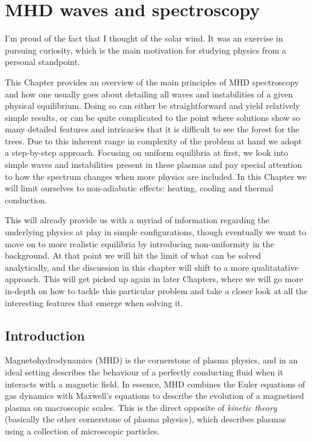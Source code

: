 \chapter{MHD waves and spectroscopy} \label{ch: spectroscopy}

\graphicspath{{02-MHD_spectroscopy/figures/}}

\begin{chapterquote}
  I'm proud of the fact that I thought of the solar wind. It was an exercise in pursuing curiosity, which is the main motivation for studying physics from a personal standpoint.
\end{chapterquote}

This Chapter provides an overview of the main principles of \gls{MHD} spectroscopy and how one usually goes about detailing all waves and instabilities of a given physical equilibrium. Doing so can either be straightforward and yield relatively simple results, or can be quite complicated to the point where solutions show so many detailed features and intricacies that it is difficult to see the forest for the trees. Due to this inherent range in complexity of the problem at hand we adopt a step-by-step approach. Focusing on uniform equilibria at first, we look into simple waves and instabilities present in these plasmas and pay special attention to how the spectrum changes when more physics are included. In this Chapter we will limit ourselves to non-adiabatic effects: heating, cooling and thermal conduction.

This will already provide us with a myriad of information regarding the underlying physics at play in simple configurations, though eventually we want to move on to more realistic equilibria by introducing non-uniformity in the background. At that point we will hit the limit of what can be solved analytically, and the discussion in this chapter will shift to a more qualitatative approach. This will get picked up again in later Chapters, where we will go more in-depth on how to tackle this particular problem and take a closer look at all the interesting features that emerge when solving it.

\section{Introduction}
Magnetohydrodynamics (\gls{MHD}) is the cornerstone of plasma physics, and in an ideal setting describes the behaviour of a perfectly conducting fluid when it interacts with a magnetic field. In essence, \gls{MHD} combines the Euler equations of gas dynamics with Maxwell's equations to describe the evolution of a magnetised plasma on macroscopic scales. This is the direct opposite of \emph{kinetic theory} (basically the other cornerstone of plasma physics), which describes plasmas using a collection of microscopic particles.

